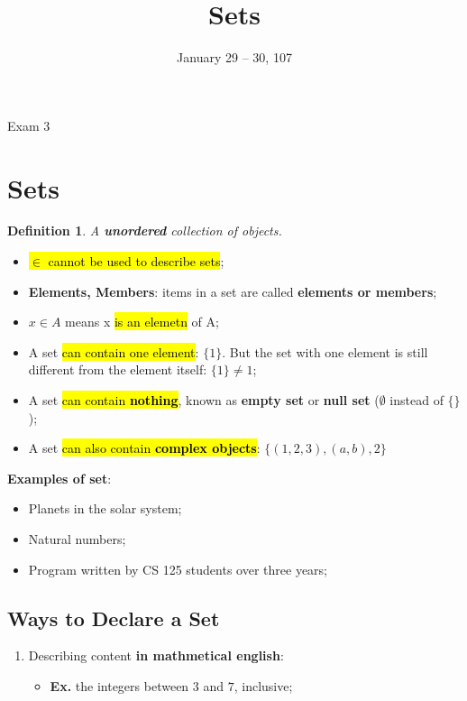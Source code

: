 \documentclass{note}
\date{January 29 -- 30, 107}
\title{Sets}
\newtheorem{definition}{Definition}
\newcommand{\ex}{\textbf{Ex.} }
\begin{document}
    \begin{note}{Exam 3}

        \section{Sets}

        \begin{definition}
            A \textbf{unordered} collection of objects.
        \end{definition}

        \begin{itemize}
            \item \hl{$ \in $ cannot be used to describe sets};
            \item \textbf{Elements, Members}: items in a set are called \textbf{elements or members};
            \item $ x \in A $ means x \hl{is an elemetn} of A;
            \item A set \hl{can contain one element}: $ \{ 1 \} $. But the set with one element is still different from the element itself:
            $ \{ 1 \} \neq 1  $;
            \item A set \hl{can contain \textbf{nothing}}, known as \textbf{empty set} or \textbf{null set} ($ \emptyset $ instead of $ \{ \} $);
            \item A set \hl{can also contain \textbf{complex objects}}: $ \{ (1,2,3), (a,b), 2 \} $
        \end{itemize}

        \textbf{Examples of set}:
        \begin{itemize}
            \item Planets in the solar system;
            \item Natural numbers;
            \item Program written by CS 125 students over three years;
        \end{itemize}

        \subsection{Ways to Declare a Set}

        \begin{enumerate}
            \item Describing content \textbf{in mathmetical english}:
            \begin{itemize}
                \item \ex the integers between $ 3 $ and $ 7 $, inclusive;
            \end{itemize}


\end{enumerate}
\end{note}
\end{document}
